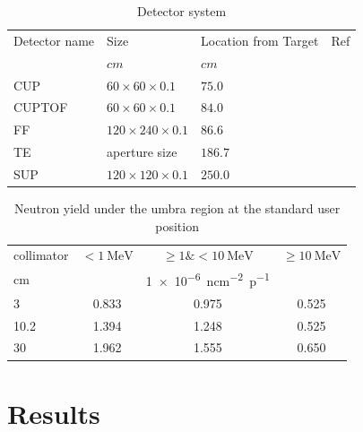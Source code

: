 \documentclass[12pt,journal]{IEEEtran}
\let\MYoriglatexcaption\caption
\renewcommand{\caption}[2][\relax]{\MYoriglatexcaption[#2]{#2}}
\begin{document}
\begin{table}[!tbp]
	\caption{Detector system}
	\label{table:DetectorSystem}
	\centering
	\begin{tabular}{lllr}
	\toprule
	Detector name & Size   & Location from Target & Ref \\
		  	   & $cm$ & $cm$			& 	\\
	\midrule
	CUP		& $60\times60\times0.1$  & $75.0$    & \cite{Prokofiev14}\\
	CUPTOF	& $60\times60\times0.1$  & $84.0$    & \cite{Prokofiev14}\\
	FF 		& $120\times240\times0.1$  & $86.6$    & \\
	TE 		& aperture size  & $186.7$  & \\
	SUP  		& $120\times120\times0.1$  & $250.0$  & \cite{Prokofiev2009}\\
	\bottomrule
	\end{tabular}
\end{table}

\begin{table}[!tbp]
\caption{Neutron yield under the umbra region at the standard user position}	%
	\label{table:NYieldRadiusEffectAtSUP}
	\centering
	\begin{tabular}{l c c c}
            \toprule
            {collimator}   &{$< \SI{1}{\MeV}$}	&{$\geq 1 \& <\SI{10}{\MeV}$}	&{$\geq \SI{10}{\MeV}$}\\
            \cmidrule(r){2-4}
            {\si{\centi\metre}}     &	&{\SI{1e-6}{ncm^{-2}p^{-1}}}	&\\
             \midrule
		3 		& 0.833 	& 0.975	& 0.525\\
		10.2 		& 1.394 	& 1.248	& 0.525\\ 
		30 		& 1.962 	& 1.555	& 0.650\\
            \bottomrule
	\end{tabular}
\end{table}

\section{Results}
\end{document}
